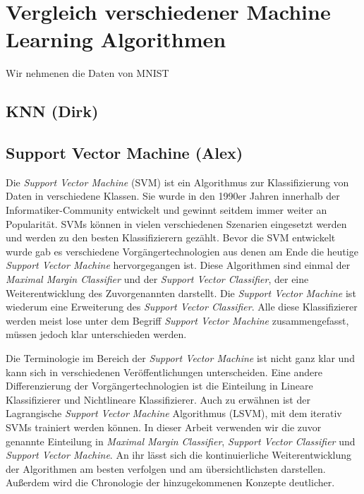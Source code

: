 \section{Vergleich verschiedener Machine Learning Algorithmen}
Wir nehmenen die Daten von MNIST
\subsection{KNN (Dirk)}

\subsection{Support Vector Machine (Alex)}
Die \textit{Support Vector Machine} (SVM) ist ein Algorithmus zur Klassifizierung von Daten in verschiedene Klassen.
Sie wurde in den 1990er Jahren innerhalb der Informatiker-Community entwickelt und gewinnt seitdem immer weiter an Popularität.
SVMs können in vielen verschiedenen Szenarien eingesetzt werden und werden zu den besten Klassifizierern gezählt.
Bevor die SVM entwickelt wurde gab es verschiedene Vorgängertechnologien aus denen am Ende die heutige \textit{Support Vector Machine} hervorgegangen ist. 
Diese Algorithmen sind einmal der \textit{Maximal Margin Classifier} und der \textit{Support Vector Classifier}, 
der eine Weiterentwicklung des Zuvorgenannten darstellt.
Die \textit{Support Vector Machine} ist wiederum eine Erweiterung des \textit{Support Vector Classifier}.
Alle diese Klassifizierer werden meist lose unter dem Begriff \textit{Support Vector Machine} zusammengefasst,
müssen jedoch klar unterschieden werden.\cite[S. 337]{james_2013}

Die Terminologie im Bereich der \textit{Support Vector Machine} ist nicht ganz klar und kann sich in verschiedenen Veröffentlichungen unterscheiden.
Eine andere Differenzierung der Vorgängertechnologien ist die Einteilung in Lineare Klassifizierer und Nichtlineare Klassifizierer.
Auch zu erwähnen ist der Lagrangische \textit{Support Vector Machine} Algorithmus (LSVM), mit dem iterativ SVMs trainiert werden können.\cite[S. 207]{suthaharan_2015}
In dieser Arbeit verwenden wir die zuvor genannte Einteilung in \textit{Maximal Margin Classifier}, \textit{Support Vector Classifier}
und \textit{Support Vector Machine}. An ihr lässt sich die kontinuierliche Weiterentwicklung der Algorithmen am besten verfolgen und am übersichtlichsten darstellen.
Außerdem wird die Chronologie der hinzugekommenen Konzepte deutlicher.

